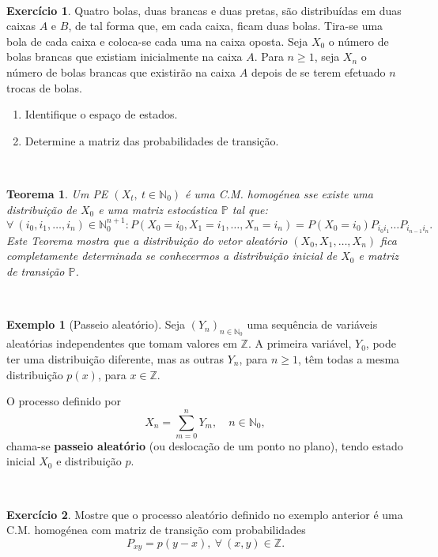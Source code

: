 \documentclass[
  11pt,
  a4paper,
]{book}
\newtheorem{theorem}{Teorema}[chapter]
\theoremstyle{definition}
\theoremstyle{definition}
\newtheorem{example}{Exemplo}[chapter]
\theoremstyle{definition}
\newtheorem{exercise}{Exercício}[chapter]
\theoremstyle{definition}
\theoremstyle{remark}
\begin{document}
\(\,\)

\begin{exercise}

Quatro bolas, duas brancas e duas pretas, são distribuídas em duas caixas \(A\) e \(B\), de tal forma que, em cada caixa, ficam duas bolas. Tira-se uma bola de cada caixa e coloca-se cada uma na caixa oposta. Seja \(X_0\) o número de bolas brancas que existiam inicialmente na caixa \(A\). Para \(n \geq 1\), seja \(X_n\) o número de bolas brancas que existirão na caixa \(A\) depois de se terem efetuado \(n\) trocas de bolas.

\begin{enumerate}
\def\labelenumi{(\alph{enumi})}
\item
  Identifique o espaço de estados.
\item
  Determine a matriz das probabilidades de transição.
\end{enumerate}

\end{exercise}

\(\,\)

\begin{theorem}
Um PE \((X_t, ~t \in \mathbb{N}_0)\) é uma C.M. homogénea sse existe uma distribuição de \(X_0\) e uma matriz estocástica \(\mathbb{P}\) tal que:
\[\forall ~(i_0,i_1,\ldots,i_n) \in \mathbb{N}_0^{n+1}: P(X_0=i_0, X_1=i_1, \ldots, X_n=i_n)=P(X_0=i_0)P_{i_0i_1} \ldots P_{i_{n-1}i_n}.\]
Este Teorema mostra que a distribuição do vetor aleatório \((X_0,X_1,\ldots,X_n)\) fica completamente determinada se conhecermos a distribuição inicial de \(X_0\) e matriz de transição \(\mathbb{P}\).
\end{theorem}

\(\,\)

\begin{example}[Passeio aleatório]
Seja \((Y_n)_{n \in \mathbb{N}_0}\) uma sequência de variáveis aleatórias independentes que tomam valores em \(\mathbb{Z}\). A primeira variável, \(Y_0\), pode ter uma distribuição diferente, mas as outras \(Y_n\), para \(n \geq 1\), têm todas a mesma distribuição \(p(x)\), para \(x \in \mathbb{Z}\).

O processo definido por
\[
X_n = \sum_{m=0}^n Y_m, \quad n \in \mathbb{N}_0,
\]
chama-se \textbf{passeio aleatório} (ou deslocação de um ponto no plano), tendo estado inicial \(X_0\) e distribuição \(p\).
\end{example}

\(\,\)

\begin{exercise}
\leavevmode

Mostre que o processo aleatório definido no exemplo anterior é uma C.M. homogénea com matriz de transição com probabilidades
\[P_{xy}=p(y-x), ~\forall ~(x,y) \in \mathbb{Z}.\]

\end{exercise}
\end{document}
